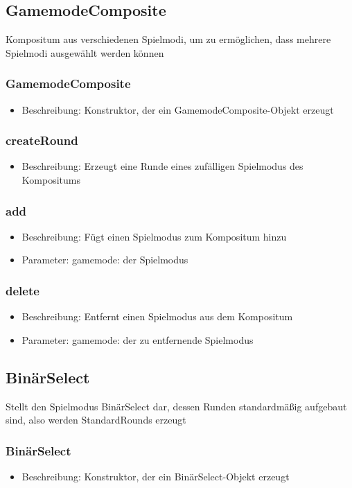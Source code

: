 \documentclass[a4paper]{scrreprt}
\begin{document}
	\subsection{GamemodeComposite}
	Kompositum aus verschiedenen Spielmodi, um zu ermöglichen, dass mehrere Spielmodi ausgewählt werden können
	\subsubsection{GamemodeComposite}
		\begin{itemize}
		\item Beschreibung: Konstruktor, der ein GamemodeComposite-Objekt erzeugt
		\end{itemize}
	\subsubsection{createRound}
	\begin{itemize}
		\item Beschreibung: Erzeugt eine Runde eines zufälligen Spielmodus des Kompositums
	\end{itemize}
	\subsubsection{add}
	\begin{itemize}
		\item Beschreibung: Fügt einen Spielmodus zum Kompositum hinzu
		\item Parameter: gamemode: der Spielmodus
	\end{itemize}
	\subsubsection{delete}
	\begin{itemize}
		\item Beschreibung: Entfernt einen Spielmodus aus dem Kompositum
		\item Parameter: gamemode: der zu entfernende Spielmodus
	\end{itemize}

	\subsection{BinärSelect}
	Stellt den Spielmodus BinärSelect dar, dessen Runden standardmäßig aufgebaut sind, also werden StandardRounds erzeugt
	\subsubsection{BinärSelect}
		\begin{itemize}
		\item Beschreibung: Konstruktor, der ein BinärSelect-Objekt erzeugt
		\end{itemize}
\end{document}
